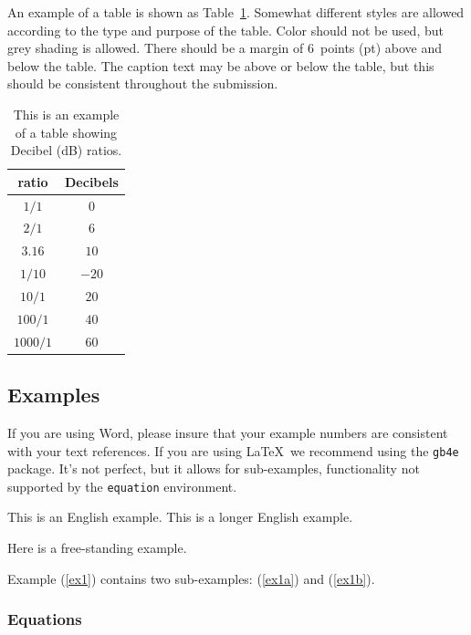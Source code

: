 \documentclass[11pt]{article}
\begin{document}
An example of a table is shown as Table~\ref{tab:decibel}.  Somewhat different
styles are allowed according to the type and purpose of the table. Color should
not be used, but grey shading is allowed. There should be a margin of 6~points
(pt) above and below the table. The caption text may be above or below the
table, but this should be consistent throughout the submission.\\%

\begin{table}[h]
\centering
\begin{tabular}{|c|c|}
\hline
\rowcolor[gray]{.75}
\hline
ratio    & Decibels\\
\hline
$1/1$    & $0$\\
$2/1$    & $6$\\
$3.16$   & $10$\\
$1/10$   & $-20$\\
$10/1$   & $20$\\
$100/1$  & $40$\\
$1000/1$ & $60$\\
\hline
\end{tabular}
\label{tab:decibel}
\caption{This is an example of a table showing Decibel (dB) ratios.}\label{tab:decibel}
\end{table}

\subsection{Examples}

If you are using Word, please insure that your example numbers are consistent
with your text references. If you are using \LaTeX\, we recommend using the
\texttt{gb4e} package. It's not perfect, but it allows for sub-examples,
functionality not supported by the \texttt{equation} environment.

\begin{exe}
\ex\label{ex1} \begin{xlist}
        \ex\label{ex1a} This is an English example.
        \ex\label{ex1b} This is a longer English example.
    \end{xlist}
\ex\label{ex2} Here is a free-standing example.
\end{exe}

Example (\ref{ex1}) contains two sub-examples: (\ref{ex1a}) and (\ref{ex1b}).

\subsubsection{Equations}
\end{document}
